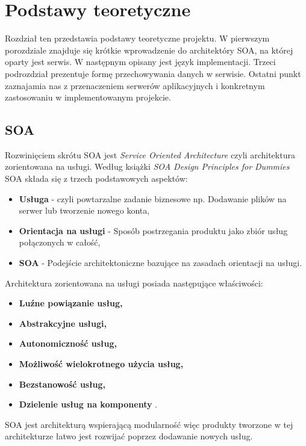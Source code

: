 \chapter{Podstawy teoretyczne}
\label{cha:podstawyTeoretyczne}
Rozdział ten przedstawia podstawy teoretyczne projektu. W pierwszym porozdziale znajduje się krótkie wprowadzenie do architektóry SOA, na której oparty jest serwis. W następnym opisany jest język implementacji. Trzeci podrozdział prezentuje formę przechowywania danych w serwisie. Ostatni punkt zaznajamia nas z przenaczeniem serwerów aplikacyjnych i konkretnym zastosowaniu w implementowanym projekcie.


\section{SOA}
\label{sec:soa}

Rozwinięciem skrótu SOA jest \textit{Service Oriented Architecture} czyli architektura zorientowana na usługi. Według książki \textit{SOA Design Principles for Dummies} SOA składa się z trzech podstawowych aspektów:
\begin{itemize}
	\item \textbf{Usługa} - czyli powtarzalne zadanie biznesowe np. Dodawanie plików na serwer lub tworzenie nowego konta,
	\item \textbf{Orientacja na usługi} - Sposób postrzegania produktu jako zbiór usług połączonych w całość,
	\item \textbf{SOA} - Podejście architektoniczne bazujące na zasadach orientacji na usługi.
\end{itemize}
Architektura zorientowana na usługi posiada następujące właściwości:
\begin{itemize}
	\item \textbf{Luźne powiązanie usług,}
	\item \textbf{Abstrakcyjne usługi,}
	\item \textbf{Autonomiczność usług,}
	\item \textbf{Możliwość wielokrotnego użycia usług,}
	\item \textbf{Bezstanowość usług,}
	\item \textbf{Dzielenie usług na komponenty} \cite{SOA13}.
\end{itemize}
SOA jest architekturą wspierającą modularność więc produkty tworzone w tej architekturze łatwo jest rozwijać poprzez dodawanie nowych usług. \newline

